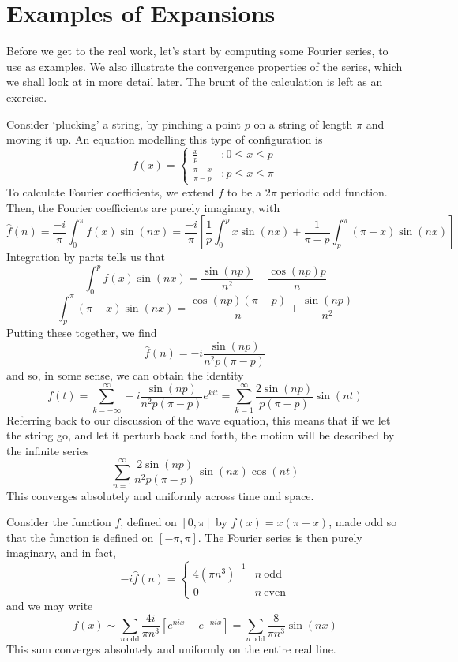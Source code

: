 \section{Examples of Expansions}

Before we get to the real work, let's start by computing some Fourier series, to use as examples. We also illustrate the convergence properties of the series, which we shall look at in more detail later. The brunt of the calculation is left as an exercise.

\begin{example}
    Consider `plucking' a string, by pinching a point $p$ on a string of length $\pi$ and moving it up. An equation modelling this type of configuration is
    \[ f(x) = \begin{cases} \frac{x}{p} & : 0 \leq x \leq p \\ \frac{\pi - x}{\pi - p} & : p \leq x \leq \pi \end{cases} \]
    To calculate Fourier coefficients, we extend $f$ to be a $2 \pi$ periodic odd function. Then, the Fourier coefficients are purely imaginary, with
    \[ \hat{f}(n) = \frac{-i}{\pi} \int_0^\pi f(x) \sin(nx) = \frac{-i}{\pi} \left[ \frac{1}{p} \int_0^p x \sin(nx) + \frac{1}{\pi - p} \int_p^\pi (\pi - x) \sin(nx) \right] \]
    Integration by parts tells us that
    \[ \int_0^p f(x) \sin(nx) = \frac{\sin(np)}{n^2} - \frac{\cos(np) p}{n} \]
    \[ \int_p^\pi (\pi - x) \sin(nx) = \frac{\cos(np) (\pi - p)}{n} + \frac{\sin(np)}{n^2} \]
    Putting these together, we find
    \[ \widehat{f}(n) = - i \frac{\sin(np)}{n^2 p (\pi - p)} \]
    and so, in some sense, we can obtain the identity
    \[ f(t) = \sum_{k = -\infty}^\infty -i \frac{\sin(np)}{n^2 p (\pi - p)} e^{k i t} = \sum_{k = 1}^\infty \frac{2 \sin(np)}{p (\pi - p)} \sin(nt) \]
    Referring back to our discussion of the wave equation, this means that if we let the string go, and let it perturb back and forth, the motion will be described by the infinite series
    \[ \sum_{n = 1}^\infty \frac{2 \sin(np)}{n^2 p (\pi - p)} \sin(nx) \cos(nt) \]
    This converges absolutely and uniformly across time and space.
\end{example}

\begin{example}
    Consider the function $f$, defined on $[0,\pi]$ by $f(x) = x(\pi - x)$, made odd so that the function is defined on $[-\pi,\pi]$. The Fourier series is then purely imaginary, and in fact,
    \[ -i \hat{f}(n) = \begin{cases} 4 (\pi n^3)^{-1} & n\ \text{odd} \\ 0 & n\ \text{even} \end{cases} \]
    and we may write
    \[ f(x) \sim \sum_{n\ \text{odd}} \frac{4i}{\pi n^3} [e^{nix} - e^{-nix}] = \sum_{n\ \text{odd}} \frac{8}{\pi n^3} \sin(nx) \]
    This sum converges absolutely and uniformly on the entire real line.
\end{example}

